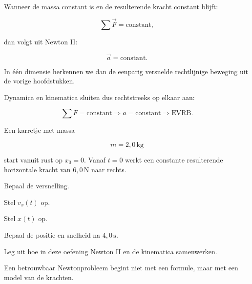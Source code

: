 \documentclass{ximera}
\begin{document}

Wanneer de massa constant is en de resulterende kracht constant blijft:

\[
\sum\vec F=\text{constant},
\]

dan volgt uit Newton II:

\[
\vec a=\text{constant}.
\]

In één dimensie herkennen we dan de eenparig versnelde rechtlijnige
beweging uit de vorige hoofdstukken.

Dynamica en kinematica sluiten dus rechtstreeks op elkaar aan:

\[
\boxed{
\sum F=\text{constant}
\Longrightarrow
a=\text{constant}
\Longrightarrow
\text{EVRB}.
}
\]


\begin{oefening}{\oefU\ESS}

Een karretje met massa

\[
m=2,0\,\mathrm{kg}
\]

start vanuit rust op $x_0=0$. Vanaf $t=0$ werkt een constante
resulterende horizontale kracht van $6,0\,\mathrm N$ naar rechts.

\begin{question}
Bepaal de versnelling.
\end{question}

\begin{question}
Stel $v_x(t)$ op.
\end{question}

\begin{question}
Stel $x(t)$ op.
\end{question}

\begin{question}
Bepaal de positie en snelheid na $4,0\,\mathrm s$.
\end{question}

\begin{question}
Leg uit hoe in deze oefening Newton II en de kinematica samenwerken.
\end{question}

\end{oefening}




Een betrouwbaar Newtonprobleem begint niet met een formule, maar met een
model van de krachten.
\end{document}

